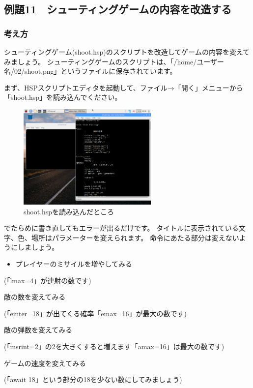 \clearpage

\subsection{例題11　シューティングゲームの内容を改造する}

\subsubsection*{考え方}

シューティングゲーム(shoot.hsp)のスクリプトを改造してゲームの内容を変えてみましょう。
シューティングゲームのスクリプトは、「/home/ユーザー名/02/shoot.png」というファイルに保存されています。

まず、HSPスクリプトエディタを起動して、ファイル→「開く」メニューから「shoot.hsp」を読み込んでください。

\begin{figure}[H]
    \begin{center}
        \includegraphics[keepaspectratio,width=6.853cm,height=5.135cm]{text02-img/text02-img043.png}
        \caption{shoot.hspを読み込んだところ}
    \end{center}
\end{figure}

でたらめに書き直してもエラーが出るだけです。
タイトルに表示されている文字、色、場所はパラメーターを変えられます。
命令にあたる部分は変えないようにしましょう。

\begin{itemize}
    \item プレイヤーのミサイルを増やしてみる
\end{itemize}

\begin{description}
    \item (「lmax=4」が連射の数です)
    \item 敵の数を変えてみる
    \item (「einter=18」が出てくる確率「emax=16」が最大の数です)
    \item 敵の弾数を変えてみる
    \item (「msrint=2」の2を大きくすると増えます「amax=16」は最大の数です)
    \item ゲームの速度を変えてみる
    \item (「await 18」という部分の18を少ない数にしてみましょう)
\end{description}

